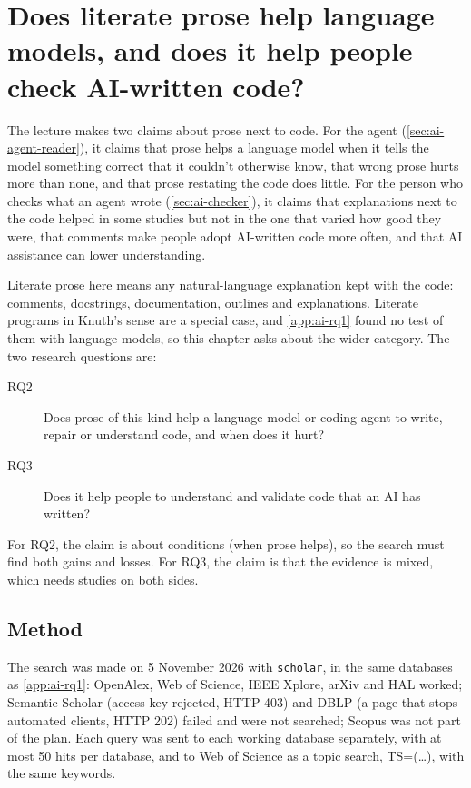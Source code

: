 \chapter{Does literate prose help language models, and does it help
  people check AI-written code?}
\label{app:ai-rq23}

The lecture makes two claims about prose next to code.
For the agent (\cref{sec:ai-agent-reader}), it claims that prose helps a
language model when it tells the model something correct that it couldn't
otherwise know, that wrong prose hurts more than none, and that prose restating
the code does little.
For the person who checks what an agent wrote (\cref{sec:ai-checker}), it
claims that explanations next to the code helped in some studies but not in the
one that varied how good they were, that comments make people adopt AI-written
code more often, and that AI assistance can lower understanding.

Literate prose here means any natural-language explanation kept with the code:
comments, docstrings, documentation, outlines and explanations.
Literate programs in Knuth's sense are a special case, and \cref{app:ai-rq1}
found no test of them with language models, so this chapter asks about the
wider category.
The two research questions are:
\begin{description}
  \item[RQ2] Does prose of this kind help a language model or coding agent to
    write, repair or understand code, and when does it hurt?
  \item[RQ3] Does it help people to understand and validate code that an AI has
    written?
\end{description}
For RQ2, the claim is about conditions (when prose helps), so the search must
find both gains and losses.
For RQ3, the claim is that the evidence is mixed, which needs studies on both
sides.

\section{Method}
\label{sec:ai-rq23-method}


The search was made on 5 November 2026 with \texttt{scholar}, in the same
databases as \cref{app:ai-rq1}: OpenAlex, Web of Science, IEEE Xplore, arXiv
and HAL worked; Semantic Scholar (access key rejected, HTTP 403) and DBLP (a
page that stops automated clients, HTTP 202) failed and were not searched;
Scopus was not part of the plan.
Each query was sent to each working database separately, with at most 50 hits
per database, and to Web of Science as a topic search, TS=(\dots), with the
same keywords.

